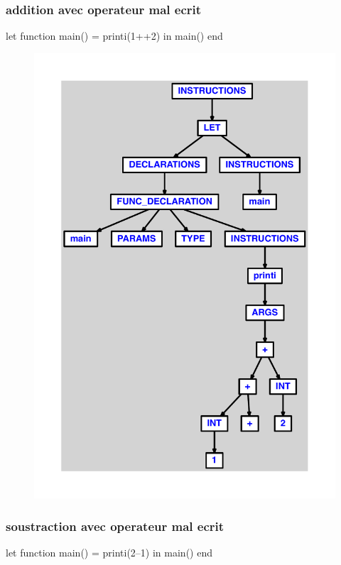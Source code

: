 \documentclass{article}
\begin{document}
\subsubsection{addition avec operateur mal ecrit}
\begin{verbatimtab}
let
	function main() = printi(1++2)
in main() end
\end{verbatimtab}
\begin{figure}[H]\centering\includegraphics[max width=\textwidth]{ast/ast_22.pdf}\end{figure}\subsubsection{soustraction avec operateur mal ecrit}
\begin{verbatimtab}
let
	function main() = printi(2--1)
in main() end
\end{verbatimtab}
\end{document}
